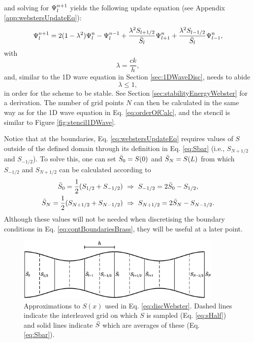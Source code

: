 and solving for $\Psi_l^{n+1}$ yields the following update equation (see Appendix \ref{app:webstersUpdateEq}):
\begin{equation}
    \Psi_l^{n+1} = 2(1-\lambda^2)\Psi_l^n-\Psi_l^{n-1}+ \frac{\lambda^2S_{l+1/2}}{\bar{S}_l}\Psi_{l+1}^n + \frac{\lambda^2S_{l-1/2}}{\bar{S}_l}\Psi_{l-1}^n,\label{eq:webstersUpdateEq}
\end{equation}
with 
\begin{equation}
    \lambda = \frac{ck}{h},
\end{equation}
and, similar to the 1D wave equation in Section \ref{sec:1DWaveDisc}, needs to abide
\begin{equation}\label{eq:CFLwebster}
    \lambda \leq 1,
\end{equation}
in order for the scheme to be stable. See Section \ref{sec:stabilityEnergyWebster} for a derivation. The number of grid points $N$ can then be calculated in the same way as for the 1D wave equation in Eq. \eqref{eq:orderOfCalc}, and the stencil is similar to Figure \ref{fig:stencil1DWave}.

Notice that at the boundaries, Eq. \eqref{eq:webstersUpdateEq} requires values of $S$ outside of the defined domain through its definition in Eq. \eqref{eq:Sbar} (i.e., $S_{N+1/2}$ and $S_{-1/2}$). To solve this, one can set $\bar{S}_0 = S(0)$ and $\bar{S}_N = S(L)$ from which $S_{-1/2}$ and $S_{N+1/2}$ can be calculated according to
\begin{subequations}
    \begin{align}
        \Sbar_0 = \frac{1}{2}(S_{1/2} + S_{-1/2}) \ &\Rightarrow \ S_{-1/2} = 2\Sbar_0 - S_{1/2},\\
        \Sbar_N = \frac{1}{2}(S_{N+1/2} + S_{N-1/2}) \ &\Rightarrow \ S_{N+1/2} = 2\Sbar_N - S_{N-1/2}.\label{eq:Snph}
    \end{align} 
\end{subequations}
Although these values will not be needed when discretising the boundary conditions in Eq. \eqref{eq:contBoundariesBrass}, they will be useful at a later point.

\begin{figure}[t]
    \centering
    \includegraphics[width=0.9\textwidth]{figures/resonators/brass/variableCrossSection.eps}
    \caption{Approximations to $S(x)$ used in Eq. \eqref{eq:discWebster}. Dashed lines indicate the interleaved grid on which $S$ is sampled (Eq. \eqref{eq:sHalf}) and solid lines indicate $\bar{S}$ which are averages of these (Eq. \eqref{eq:Sbar}). \label{fig:variableCrossSection}}
\end{figure}


